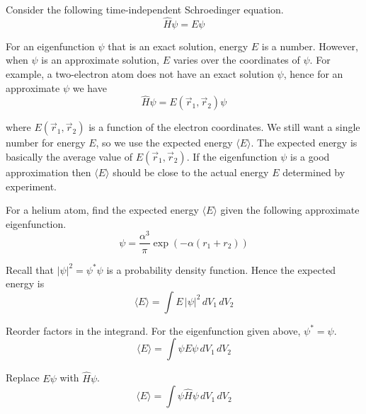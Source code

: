 \documentclass[12pt]{article}
\begin{document}
Consider the following time-independent Schroedinger equation.
\begin{equation*}
\hat{H}\psi=E\psi
\end{equation*}

For an eigenfunction $\psi$ that is an exact solution, energy $E$ is a number.
However, when $\psi$ is an approximate solution, $E$ varies over the coordinates of $\psi$.
For example, a two-electron atom does not have an exact solution $\psi$,
hence for an approximate $\psi$ we have
\begin{equation*}
\hat{H}\psi=E(\vec{r}_1,\vec{r}_2)\psi
\end{equation*}

where $E(\vec{r}_1,\vec{r}_2)$ is a function of the electron coordinates.
We still want a single number for energy $E$, so we use the expected energy $\langle E\rangle$.
The expected energy is basically the average value of $E(\vec{r}_1,\vec{r}_2)$.
If the eigenfunction $\psi$ is a good approximation
then $\langle E\rangle$ should be close to the actual energy $E$ determined by experiment.

\bigskip
For a helium atom, find the expected energy $\langle E\rangle$ given the following approximate eigenfunction.
\begin{equation*}
\psi=\frac{\alpha^3}{\pi}\exp\left(-\alpha (r_1+r_2)\right)
\end{equation*}

Recall that $|\psi|^2=\psi^*\psi$ is a probability density function.
Hence the expected energy is
\begin{equation*}
\langle E\rangle=\int E\,|\psi|^2\,dV_1\,dV_2
\end{equation*}

Reorder factors in the integrand.
For the eigenfunction given above, $\psi^*=\psi$.
\begin{equation*}
\langle E\rangle=\int\psi E\psi\,dV_1\,dV_2
\end{equation*}

Replace $E\psi$ with $\hat{H}\psi$.
\begin{equation*}
\langle E\rangle=\int\psi\hat{H}\psi\,dV_1\,dV_2
\end{equation*}
\end{document}
